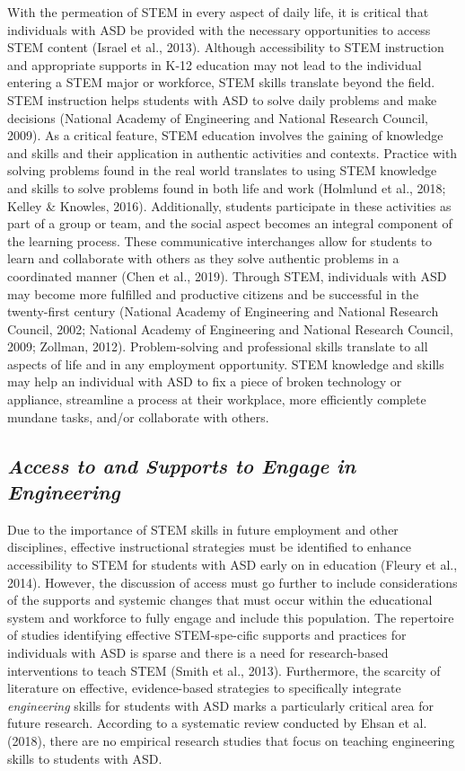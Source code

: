 \documentclass[11.5pt]{sig-alternate}
\begin{document}
\begin{large}
With the permeation of STEM in every aspect of daily life, it is critical that individuals with ASD be provided with the necessary opportunities to access STEM content (Israel et al., 2013). Although accessibility to STEM instruction and appropriate supports in K-12 education may not lead to the individual entering a STEM major or workforce, STEM skills translate beyond the field. STEM instruction helps students with ASD to solve daily problems and make decisions (National Academy of Engineering and National Research Council, 2009). As a critical feature, STEM education involves the gaining of knowledge and skills and their application in authentic activities and contexts. Practice with solving problems found in the real world translates to using STEM knowledge and skills to solve problems found in both life and work (Holmlund et al., 2018; Kelley \& Knowles, 2016). Additionally, students participate in these activities as part of a group or team, and the social aspect becomes an integral component of the learning process. These communicative interchanges allow for students to learn and collaborate with others as they solve authentic problems in a coordinated manner (Chen et al., 2019). Through STEM, individuals with ASD may become more fulfilled and productive citizens and be successful in the twenty-first century (National Academy of Engineering and National Research Council, 2002; National Academy of Engineering and National Research Council, 2009; Zollman, 2012). Problem-solving and professional skills translate to all aspects of life and in any employment opportunity. STEM knowledge and skills may help an individual with ASD to fix a piece of broken technology or appliance, streamline a process at their workplace, more efficiently complete mundane tasks, and/or collaborate with others. 

\subsection*{\textbf{\textit{Access to and Supports to Engage in Engineering}}}

Due to the importance of STEM skills in future employment and other disciplines, effective instructional strategies must be identified to enhance accessibility to STEM for students with ASD early on in education (Fleury et al., 2014). However, the discussion of access must go further to include considerations of the supports and systemic changes that must occur within the educational system and workforce to fully engage and include this population. The repertoire of studies identifying effective STEM-spe-cific supports and practices for individuals with ASD is sparse and there is a need for research-based interventions to teach STEM (Smith et al., 2013). Furthermore, the scarcity of literature on effective, evidence-based strategies to specifically integrate \textit{engineering} skills for students with ASD marks a particularly critical area for future research. According to a systematic review conducted by Ehsan et al. (2018), there are no empirical research studies that focus on teaching engineering skills to students with ASD. 


\end{large}
\end{document}

